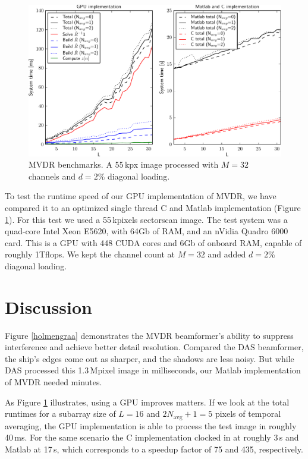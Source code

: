 \documentclass[10pt,a4paper]{article}
\newcommand\1{\vec 1}
\begin{document}
\begin{figure}[!t]
\centering
\includegraphics[width=\linewidth]{gfx/benchmark.pdf}
\caption{\gls{MVDR} benchmarks. \protect\newline A 55\,kpx image processed with $M=32$ channels and $d=2\%$ diagonal loading.}\label{benchmarks}
\end{figure}

To test the runtime speed of our \gls{GPU} implementation of \gls{MVDR}, we have compared it to an optimized single thread C and Matlab implementation (Figure \ref{benchmarks}). For this test we used a 55\,kpixels sectorscan image. The test system was a quad-core Intel Xeon E5620, with 64Gb of \gls{RAM}, and an nVidia Quadro 6000 card. This is a \gls{GPU} with 448 \gls{CUDA} cores and 6Gb of onboard \gls{RAM}, capable of roughly 1Tflops. We kept the channel count at $M=32$ and added $d=2\%$ diagonal loading. 

\section{Discussion}

Figure \ref{holmengraa} demonstrates the \gls{MVDR} beamformer's ability to suppress interference and achieve better detail resolution. Compared the \gls{DAS} beamformer, the ship's edges come out as sharper, and the shadows are less noisy. But while \gls{DAS} processed this 1.3\,Mpixel image in milliseconds, our Matlab implementation of \gls{MVDR} needed minutes.

As Figure \ref{benchmarks} illustrates, using a \gls{GPU} improves matters. If we look at the total runtimes for a subarray size of $L=16$ and $2N_\text{avg}+1=5$ pixels of temporal averaging, the \gls{GPU} implementation is able to process the test image in roughly 40\,ms.  For the same scenario the C implementation clocked in at roughly 3\,s and Matlab at 17\,s, which corresponds to a speedup factor of 75 and 435, respectively.
\end{document}
